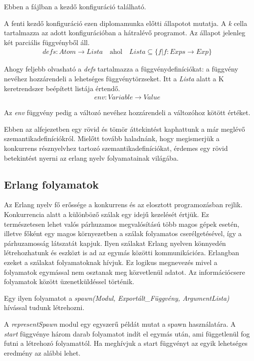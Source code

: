 Ebben a fájlban a kezdő konfiguráció található.



A fenti kezdő konfiguráció ezen diplomamunka előtti állapotot mutatja. A \textit{k} cella tartalmazza az adott konfigurációban a hátralévő programot. Az állapot jelenleg két parciális függvényből áll. 
\begin{align*}
defs: Atom \rightarrow Lista \quad \textrm{ahol} \quad Lista \subseteq \{f | f : Exps \rightarrow Exp\}
\end{align*}

Ahogy feljebb olvasható a \textit{defs} tartalmazza a függvénydefiníciókat: a függvény nevéhez hozzárendeli a lehetséges függvénytörzseket. Itt a \textit{Lista} alatt a K keretrendszer beépített listája értendő.
\begin{align*}
env: Variable \rightarrow Value
\end{align*}

Az \textit{env} függvény pedig a változó nevéhez hozzárendeli a változóhoz kötött értéket.

Ebben az alfejezetben egy rövid és tömör áttekintést kaphattunk a már meglévő szemantikadefiníciókról. Mielőtt tovább haladnánk, hogy megismerjük a konkurrens résznyelvhez tartozó szemantikadefiníciókat, érdemes egy rövid betekintést nyerni az erlang nyelv folyamatainak világába.

\subsection{Erlang folyamatok}
Az Erlang nyelv fő erőssége a konkurrens és az elosztott programozásban rejlik. Konkurrencia alatt a különböző szálak egy idejű kezelését értjük. Ez természetesen lehet valós párhuzamos megvalósítású több magos gépek esetén, illetve főként egy magos környezetben a szálak folyamatos cserélgetésével, így a párhuzamosság látszatát kapjuk. Ilyen szálakat Erlang nyelven könnyedén létrehozhatunk és eszközt is ad az egymás közötti kommunikációra. Erlangban ezeket a szálakat folyamatoknak hívjuk. Ez logikus megnevezés mivel a folyamatok egymással nem osztanak meg közvetlenül adatot. Az információcsere folyamatok között üzenetküldéssel történik.

Egy ilyen folyamatot a \textit{spawn(Modul, Exportált\_Függvény, ArgumentLista)} hívással tudunk létrehozni.



A \textit{representSpawn} modul egy egyszerű példát mutat a spawn használatára. A \textit{start} függvénye három darab folyamatot indít el egymás után, ami függetlenül fog futni a létrehozó folyamattól. Ha meghívjuk a start függvényt az egyik lehetséges eredmény az alábbi lehet.

